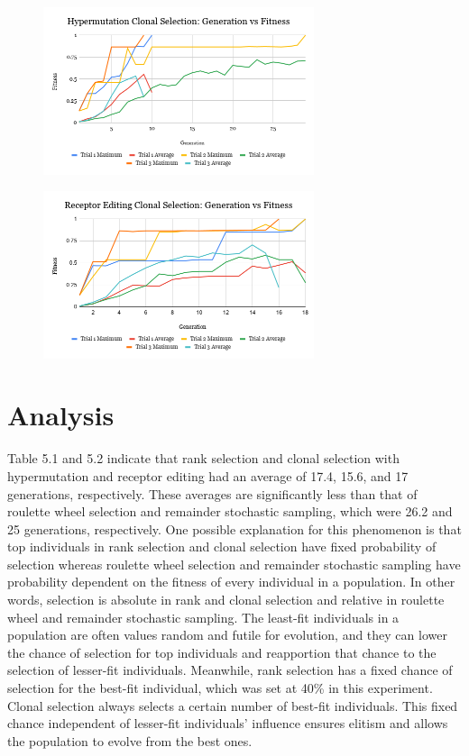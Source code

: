 \documentclass[]{interact}
\theoremstyle{plain} %
\theoremstyle{definition}
\theoremstyle{remark}
\begin{document}
\begin{figure}[H]
    \centering
    \includegraphics[width=300px]{img/Hypermutation Clonal Selection_ Generation vs Fitness.png}
    \label{fig:hypermutation-graph}
\end{figure}

\begin{figure}[H]
    \centering
    \includegraphics[width=300px]{img/Receptor Editing Clonal Selection_ Generation vs Fitness.png}
    \label{fig:receptor-graph}
\end{figure}

\section{Analysis}

Table 5.1 and 5.2 indicate that rank selection and clonal selection with hypermutation and receptor editing had an average of 17.4, 15.6, and 17 generations, respectively. These averages are significantly less than that of roulette wheel selection and remainder stochastic sampling, which were 26.2 and 25 generations, respectively. One possible explanation for this phenomenon is that top individuals in rank selection and clonal selection have fixed probability of selection whereas roulette wheel selection and remainder stochastic sampling have probability dependent on the fitness of every individual in a population. In other words, selection is absolute in rank and clonal selection and relative in roulette wheel and remainder stochastic sampling. The least-fit individuals in a population are often values random and futile for evolution, and they can lower the chance of selection for top individuals and reapportion that chance to the selection of lesser-fit individuals. Meanwhile, rank selection has a fixed chance of selection for the best-fit individual, which was set at 40\% in this experiment. Clonal selection always selects a certain number of best-fit individuals. This fixed chance independent of lesser-fit individuals' influence ensures elitism and allows the population to evolve from the best ones.
\end{document}

